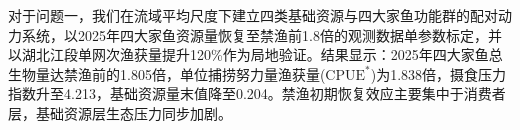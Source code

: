 对于问题一，我们在流域平均尺度下建立四类基础资源与四大家鱼功能群的配对动力系统，以2025年四大家鱼资源量恢复至禁渔前1.8倍的观测数据单参数标定，并以湖北江段单网次渔获量提升120\%作为局地验证。结果显示：2025年四大家鱼总生物量达禁渔前的1.805倍，单位捕捞努力量渔获量($\mathrm{CPUE}^*$)为1.838倍，摄食压力指数升至4.213，基础资源量末值降至0.204。禁渔初期恢复效应主要集中于消费者层，基础资源层生态压力同步加剧。
